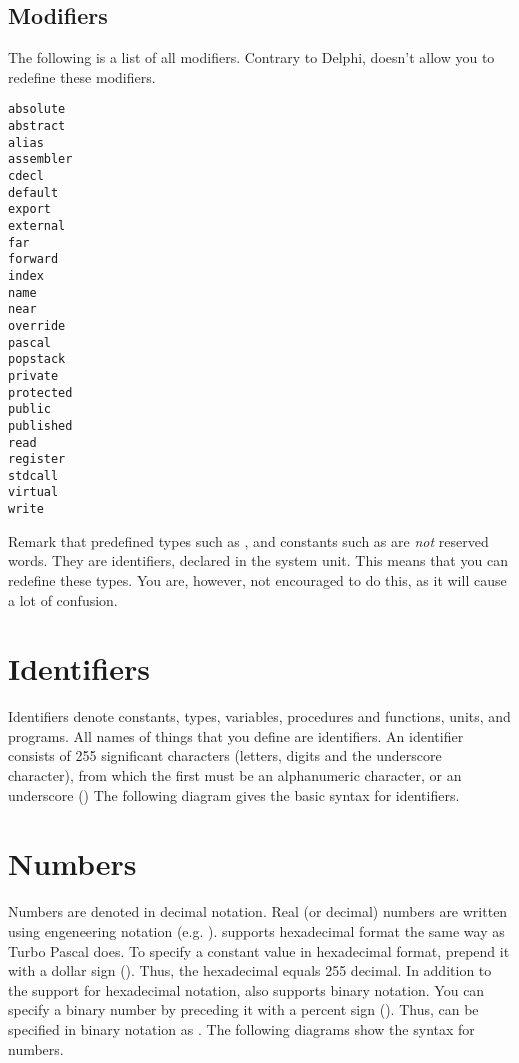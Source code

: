 \documentclass{report}
\begin{document}
\subsection{Modifiers}
The following is a list of all modifiers. Contrary to Delphi, \fpc doesn't
allow you to redefine these modifiers.
\begin{multicols}{4}
\begin{verbatim}
absolute
abstract
alias
assembler
cdecl
default
export
external
far
forward
index
name
near
override
pascal
popstack
private
protected
public
published
read
register
stdcall
virtual
write
\end{verbatim}
\end{multicols}
Remark that predefined types such as ,  and constants
such as  are {\em not} reserved words. They are
identifiers, declared in the system unit. This means that you can redefine
these types. You are, however, not encouraged to do this, as it will cause
a lot of confusion.

\section{Identifiers}
Identifiers denote constants, types, variables, procedures and functions,
units, and programs. All names of things that you define are identifiers.
An identifier consists of 255 significant characters (letters, digits and
the underscore character), from which the first must be an alphanumeric
character, or an underscore (\var{\_})
The following diagram gives the basic syntax for identifiers.


\section{Numbers}
Numbers are denoted in decimal notation. Real (or decimal) numbers are
written using engeneering notation (e.g. ).
\fpc supports hexadecimal format the same way as Turbo Pascal does. To
specify a constant value in hexadecimal format, prepend it with a dollar
sign (\var{\$}). Thus, the hexadecimal  equals 255 decimal.
In addition to the support for hexadecimal notation, \fpc also supports
binary notation. You can specify a binary number by preceding it with a
percent sign (\var{\%}). Thus,  can be specified in binary notation
as .
The following diagrams show the syntax for numbers.

\end{document}

